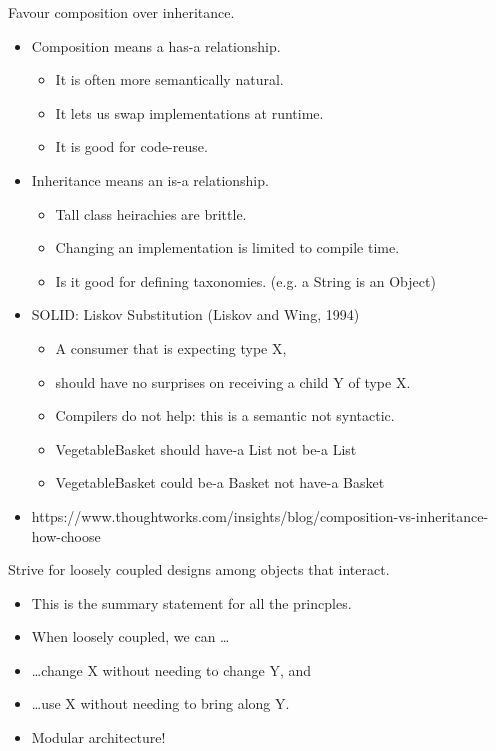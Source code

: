\documentclass{beamer}
\begin{document}
\begin{frame}{Favour composition over inheritance.}
    \begin{itemize}
        \item Composition means a has-a relationship.
            \begin{itemize}
                \item It is often more semantically natural.
                \item It lets us swap implementations at runtime.
                \item It is good for code-reuse.
            \end{itemize}
        \item Inheritance means an is-a relationship.
            \begin{itemize}
                \item Tall class heirachies are brittle.
                \item Changing an implementation is limited to compile time.
                \item Is it good for defining taxonomies. (e.g. a String is an Object)
            \end{itemize}
        \item SOLID: Liskov Substitution (Liskov and Wing, 1994)
            \begin{itemize}
                \item A consumer that is expecting type X, 
                \item should have no surprises on receiving a child Y of type X.
                \item Compilers do not help: this is a semantic not syntactic.
                \item VegetableBasket should have-a List not be-a List
                \item VegetableBasket could be-a Basket not have-a Basket
            \end{itemize}
        \item https://www.thoughtworks.com/insights/blog/composition-vs-inheritance-how-choose
    \end{itemize}
\end{frame}

\begin{frame}{Strive for loosely coupled designs among objects that interact.}
    \begin{itemize}
        \item This is the summary statement for all the princples.
        \item When loosely coupled, we can \ldots
        \item \ldots change X without needing to change Y, and
        \item \ldots use X without needing to bring along Y.
        \item Modular architecture!
    \end{itemize}
\end{frame}
\end{document}
